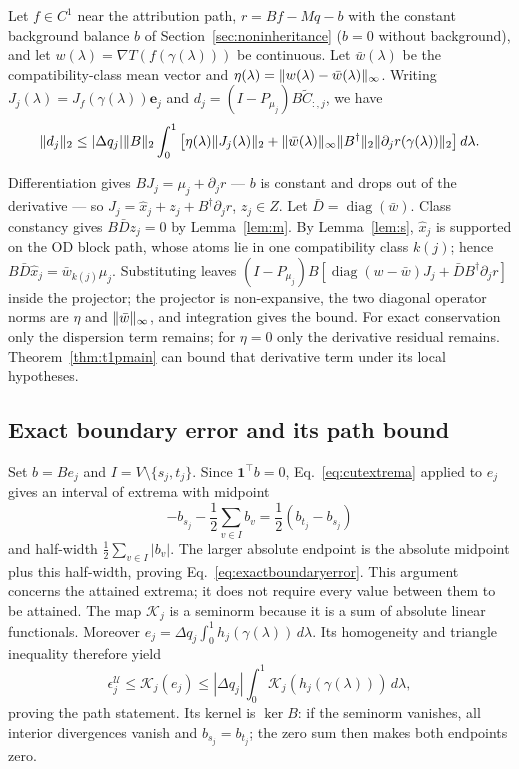 \begin{proposition}\label{prop:combined}
Let $f\in C^1$ near the attribution path, $r=Bf-Mq-b$ with the constant
background balance $b$ of Section~\ref{sec:noninheritance} ($b=0$
without background), and let
$w(\lambda)=\nabla T(f(\gamma(\lambda)))$ be continuous.
Let $\bar w(\lambda)$ be the compatibility-class mean vector and
$\eta(\lambda)=\lVert w(\lambda)-\bar w(\lambda) \rVert_\infty$.
Writing $J_j(\lambda)=J_f(\gamma(\lambda))\mathbf e_j$ and
$d_j=(I-P_{\mu_j})B\widetilde C_{:,j}$, we have
\[
\lVert d_j \rVert_2\le |\Delta q_j|\lVert B \rVert_2\int_0^1\left[
\eta(\lambda)\lVert J_j(\lambda) \rVert_2+
\lVert \bar w(\lambda) \rVert_\infty\lVert B^\dagger \rVert_2
\lVert \partial_jr(\gamma(\lambda)) \rVert_2\right]d\lambda.
\]
\end{proposition}
\begin{pf}
Differentiation gives $BJ_j=\mu_j+\partial_jr$ --- $b$ is constant and
drops out of the derivative --- so
$J_j=\hat x_j+z_j+B^\dagger\partial_jr$, $z_j\in Z$.
Let $\bar D=\operatorname{diag}(\bar w)$. Class constancy gives
$B\bar Dz_j=0$ by Lemma~\ref{lem:m}. By Lemma~\ref{lem:s},
$\hat x_j$ is supported on the OD block path, whose atoms lie in one
compatibility class $k(j)$; hence
$B\bar D\hat x_j=\bar w_{k(j)}\mu_j$.
Substituting leaves
$(I-P_{\mu_j})B[\operatorname{diag}(w-\bar w)J_j+\bar
DB^\dagger\partial_jr]$ inside the projector; the projector is
non-expansive, the two diagonal operator norms are
$\eta$ and $\lVert \bar w \rVert_\infty$, and integration gives the bound.
For exact conservation only the dispersion term remains; for
$\eta=0$ only the derivative residual remains. Theorem~\ref{thm:t1pmain}
can bound that derivative term under its local hypotheses.
\end{pf}

\subsection{Exact boundary error and its path bound}\label{app:boundaryerror}
\begin{pf}
Set $b=Be_j$ and $I=V\setminus\{s_j,t_j\}$. Since $\mathbf1^\top b=0$,
Eq.~\eqref{eq:cutextrema} applied to $e_j$ gives an interval of extrema
with midpoint
\[
-b_{s_j}-\frac12\sum_{v\in I}b_v
=\frac12(b_{t_j}-b_{s_j})
\]
and half-width $\frac12\sum_{v\in I}|b_v|$. The larger absolute
endpoint is the absolute midpoint plus this half-width, proving
Eq.~\eqref{eq:exactboundaryerror}. This argument concerns the attained
extrema; it does not require every value between them to be attained.
The map $\mathcal K_j$ is a seminorm because it is a sum of absolute
linear functionals. Moreover
$e_j=\Delta q_j\int_0^1 h_j(\gamma(\lambda))\,d\lambda$.
Its homogeneity and triangle inequality therefore yield
\[
\epsilon_j^{\mathcal U}\le\mathcal K_j(e_j)
\le |\Delta q_j|\int_0^1\mathcal K_j(h_j(\gamma(\lambda)))\,d\lambda,
\]
proving the path statement. Its kernel is $\ker B$: if the seminorm
vanishes, all interior divergences vanish and $b_{s_j}=b_{t_j}$;
the zero sum then makes both endpoints zero.
\end{pf}

